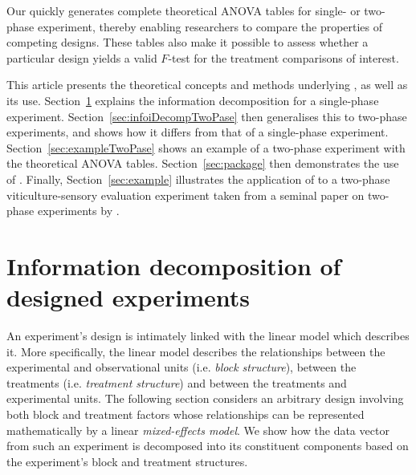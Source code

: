 \documentclass[article]{jss}
\begin{document}
Our  quickly generates complete theoretical ANOVA tables for single- or two-phase experiment, thereby enabling researchers to compare the properties of competing designs. These tables also make it possible to assess whether a particular design yields a valid $F$-test for the treatment comparisons of interest.

This article presents the theoretical concepts and methods underlying , as well as its use. Section~\ref{sec:infoDecomp} explains the information decomposition for a single-phase experiment. Section~\ref{sec:infoiDecompTwoPase} then generalises this to two-phase experiments, and shows how it differs from that of a single-phase experiment. Section~\ref{sec:exampleTwoPase} shows an example of a two-phase experiment with the theoretical ANOVA tables. Section~\ref{sec:package} then demonstrates the use of . Finally, Section~\ref{sec:example} illustrates the application of  to a two-phase viticulture-sensory evaluation experiment taken from a seminal paper on two-phase experiments by \cite{Brien1999}.

\section{Information decomposition of designed experiments} 
\label{sec:infoDecomp}
An experiment's design is intimately linked with the linear model which describes it. More specifically, the linear model describes the relationships between the experimental and observational units (i.e. \emph{block structure}), between the treatments (i.e. \emph{treatment structure}) and between the treatments and experimental units. The following section considers an arbitrary design involving both block and treatment factors whose relationships can be represented mathematically by a linear \emph{mixed-effects model}. We show how the data vector from such an experiment is decomposed into its constituent components based on the experiment's block and treatment structures.
\end{document}
